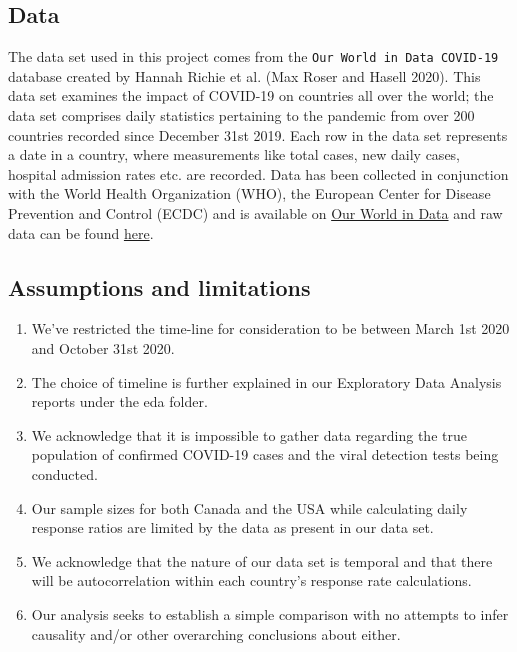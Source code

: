 \documentclass[
]{article}
\providecommand{\tightlist}{%
  \setlength{\itemsep}{0pt}\setlength{\parskip}{0pt}}
\begin{document}
\hypertarget{data}{%
\subsection{Data}\label{data}}

The data set used in this project comes from the
\texttt{Our\ World\ in\ Data\ COVID-19} database created by Hannah
Richie et al. (Max Roser and Hasell 2020). This data set examines the
impact of COVID-19 on countries all over the world; the data set
comprises daily statistics pertaining to the pandemic from over 200
countries recorded since December 31st 2019. Each row in the data set
represents a date in a country, where measurements like total cases, new
daily cases, hospital admission rates etc. are recorded. Data has been
collected in conjunction with the World Health Organization (WHO), the
European Center for Disease Prevention and Control (ECDC) and is
available on \href{https://ourworldindata.org/coronavirus}{Our World in
Data} and raw data can be found
\href{https://raw.githubusercontent.com/owid/covid-19-data/master/public/data/owid-covid-data.csv}{here}.

\hypertarget{assumptions-and-limitations}{%
\subsection{Assumptions and
limitations}\label{assumptions-and-limitations}}

\begin{enumerate}
\def\labelenumi{\arabic{enumi}.}
\tightlist
\item
  We've restricted the time-line for consideration to be between March
  1st 2020 and October 31st 2020.
\item
  The choice of timeline is further explained in our Exploratory Data
  Analysis reports under the eda folder.
\item
  We acknowledge that it is impossible to gather data regarding the true
  population of confirmed COVID-19 cases and the viral detection tests
  being conducted.
\item
  Our sample sizes for both Canada and the USA while calculating daily
  response ratios are limited by the data as present in our data set.
\item
  We acknowledge that the nature of our data set is temporal and that
  there will be autocorrelation within each country's response rate
  calculations.
\item
  Our analysis seeks to establish a simple comparison with no attempts
  to infer causality and/or other overarching conclusions about either.
\end{enumerate}
\end{document}
